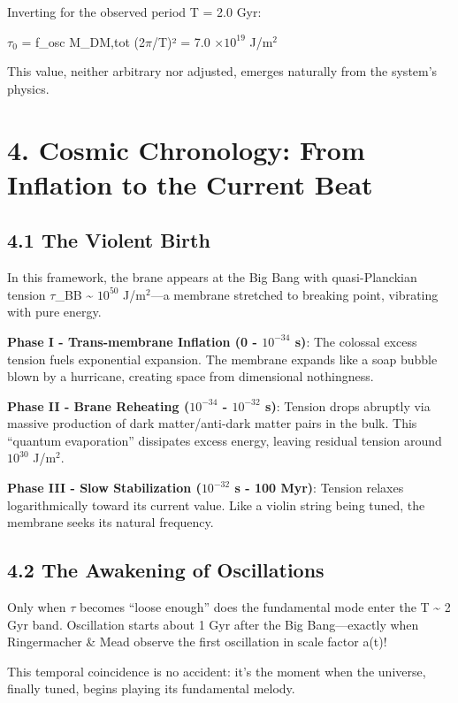 \documentclass[
  11pt,
]{report}
\begin{document}
Inverting for the observed period T = 2.0 Gyr:

\(\tau_0\) = f\_osc M\_DM,tot (2\(\pi\)/T)² = 7.0 \(\times 10^{19}\)
J/m\(^2\)

This value, neither arbitrary nor adjusted, emerges naturally from the
system's physics.

\section{4. Cosmic Chronology: From Inflation to the Current
Beat}\label{cosmic-chronology-from-inflation-to-the-current-beat}

\subsection{4.1 The Violent Birth}\label{the-violent-birth}

In this framework, the brane appears at the Big Bang with
quasi-Planckian tension \(\tau\)\_BB \textasciitilde{} \(10^{50}\)
J/m\(^2\)---a membrane stretched to breaking point, vibrating with pure
energy.

\textbf{Phase I - Trans-membrane Inflation (0 - \(10^{-34}\) s)}: The
colossal excess tension fuels exponential expansion. The membrane
expands like a soap bubble blown by a hurricane, creating space from
dimensional nothingness.

\textbf{Phase II - Brane Reheating (\(10^{-34}\) - \(10^{-32}\) s)}:
Tension drops abruptly via massive production of dark matter/anti-dark
matter pairs in the bulk. This ``quantum evaporation'' dissipates excess
energy, leaving residual tension around \(10^{30}\) J/m\(^2\).

\textbf{Phase III - Slow Stabilization (\(10^{-32}\) s - 100 Myr)}:
Tension relaxes logarithmically toward its current value. Like a violin
string being tuned, the membrane seeks its natural frequency.

\subsection{4.2 The Awakening of
Oscillations}\label{the-awakening-of-oscillations}

Only when \(\tau\) becomes ``loose enough'' does the fundamental mode
enter the T \textasciitilde{} 2 Gyr band. Oscillation starts about 1 Gyr
after the Big Bang---exactly when Ringermacher \& Mead observe the first
oscillation in scale factor a(t)!

This temporal coincidence is no accident: it's the moment when the
universe, finally tuned, begins playing its fundamental melody.
\end{document}

